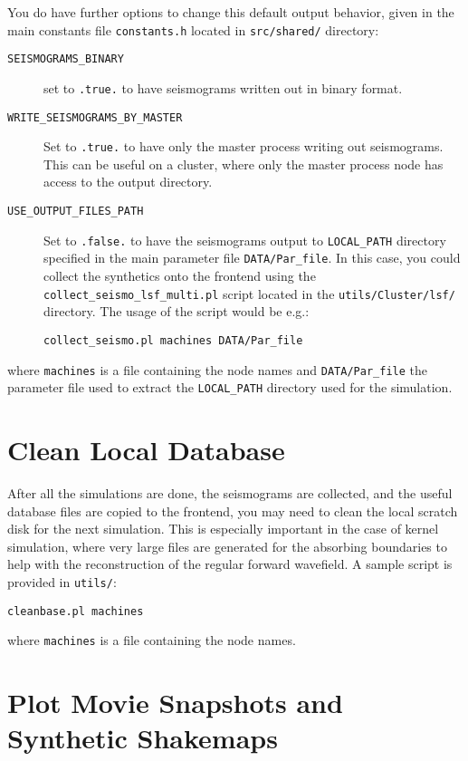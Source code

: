 You do have further options to change this default output behavior,
given in the main constants file \texttt{constants.h} located in \texttt{src/shared/}
directory:
\begin{description}
\item [{\texttt{SEISMOGRAMS\_BINARY}}] set to \texttt{.true.} to have seismograms
written out in binary format.
\item [{\texttt{WRITE\_SEISMOGRAMS\_BY\_MASTER}}] Set to \texttt{.true.}
to have only the master process writing out seismograms. This can
be useful on a cluster, where only the master process node has access
to the output directory.
\item [{\texttt{USE\_OUTPUT\_FILES\_PATH}}] Set to \texttt{.false.} to
have the seismograms output to \texttt{LOCAL\_PATH} directory specified
in the main parameter file \texttt{DATA/Par\_file}. In this case,
you could collect the synthetics onto the frontend using the \texttt{collect\_seismo\_lsf\_multi.pl}
script located in the \texttt{utils/Cluster/lsf/} directory. The usage
of the script would be e.g.:

\begin{verbatim}
collect_seismo.pl machines DATA/Par_file
\end{verbatim}

\end{description}

where \texttt{machines} is a file containing the node names and \texttt{DATA/Par\_file}
the parameter file used to extract the \texttt{LOCAL\_PATH} directory
used for the simulation.


\section{Clean Local Database}

After all the simulations are done, the seismograms are collected,
and the useful database files are copied to the frontend, you may
need to clean the local scratch disk for the next simulation. This
is especially important in the case of kernel simulation, where very
large files are generated for the absorbing boundaries to help with
the reconstruction of the regular forward wavefield. A sample script
is provided in \texttt{utils/}:
\begin{verbatim}
cleanbase.pl machines
\end{verbatim}
where \texttt{machines} is a file containing the node names.


\section{Plot Movie Snapshots and Synthetic Shakemaps}


